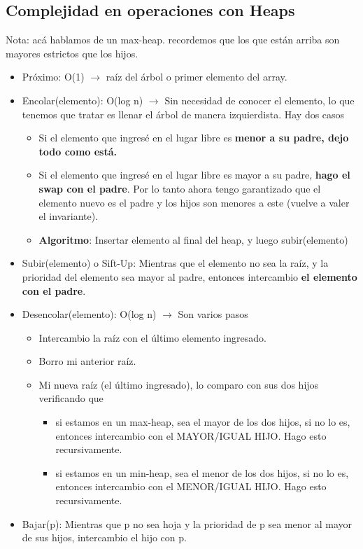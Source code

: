 \documentclass[10pt,a4paper]{article}
\begin{document}
\subsection*{Complejidad en operaciones con Heaps}
Nota: acá hablamos de un max-heap. recordemos que los que están arriba son mayores estrictos que los hijos.
\begin{itemize}
    \item Próximo: O(1) $\rightarrow$ raíz del árbol o primer elemento del array.
    \item Encolar(elemento): O(log n) $\rightarrow$ Sin necesidad de conocer el elemento, lo que tenemos que tratar es llenar el árbol de manera izquierdista. Hay dos casos
    \begin{itemize}
        \item Si el elemento que ingresé en el lugar libre es \textbf{menor a su padre, dejo todo como está.}
        \item Si el elemento que ingresé en el lugar libre es mayor a su padre, \textbf{hago el swap con el padre}. Por lo tanto ahora tengo garantizado que el elemento nuevo es el padre y los hijos son menores a este (vuelve a valer el invariante).
        \item \textbf{Algoritmo}: Insertar elemento al final del heap, y luego subir(elemento)
    \end{itemize}
    \item Subir(elemento) o Sift-Up: Mientras que el elemento no sea la raíz, y la prioridad del elemento sea mayor al padre, entonces intercambio \textbf{el elemento con el padre}.
    \item Desencolar(elemento): O(log n) $\rightarrow$ Son varios pasos 
    \begin{itemize}
        \item Intercambio la raíz con el último elemento ingresado. 
        \item Borro mi anterior raíz.
        \item Mi nueva raíz (el último ingresado), lo comparo con sus dos hijos verificando que 
        \begin{itemize}
            \item si estamos en un max-heap, sea el mayor de los dos hijos, si no lo es, entonces intercambio con el MAYOR/IGUAL HIJO. Hago esto recursivamente. 
            \item si estamos en un min-heap, sea el menor de los dos hijos, si no lo es, entonces intercambio con el MENOR/IGUAL HIJO. Hago esto recursivamente. 
        \end{itemize} 
    \end{itemize} 
    \item Bajar(p): Mientras que p no sea hoja y la prioridad de p sea menor al mayor de sus hijos, intercambio el hijo con p.

\end{itemize}
\end{document}
